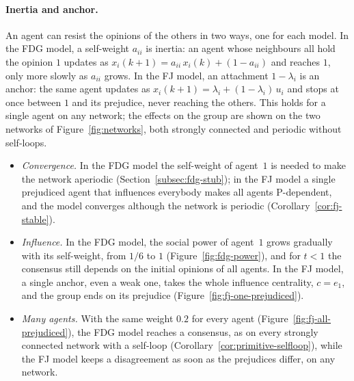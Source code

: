 \paragraph{Inertia and anchor.}
An agent can resist the opinions of the others in two ways, one for each model.
In the FDG model, a self-weight $a_{ii}$ is inertia:
an agent whose neighbours all hold the opinion $1$ updates as
$x_i(k+1) = a_{ii}\, x_i(k) + (1 - a_{ii})$ and reaches $1$, only more slowly as $a_{ii}$
grows. In the FJ model, an attachment $1 - \lambda_i$ is an anchor: the same agent updates as
$x_i(k+1) = \lambda_i + (1 - \lambda_i)\, u_i$ and stops at once between $1$ and its
prejudice, never reaching the others. This holds for a single agent on any network; the
effects on the group are shown on the two networks of Figure~\ref{fig:networks}, both
strongly connected and periodic without self-loops.
\begin{itemize}
  \item \emph{Convergence.} In the FDG model the self-weight of agent~$1$ is needed to
        make the network aperiodic (Section~\ref{subsec:fdg-stub}); in the FJ model a
        single prejudiced agent that influences everybody makes all agents P-dependent, and
        the model converges although the network is periodic
        (Corollary~\ref{cor:fj-stable}).
  \item \emph{Influence.} In the FDG model, the social power of agent~$1$ grows gradually with its
        self-weight, from $1/6$ to $1$ (Figure~\ref{fig:fdg-power}), and for $t < 1$
        the consensus still depends on the initial opinions of all agents. In the FJ
        model, a single anchor, even a weak one,
 takes the whole influence centrality,
 $c = e_1$, and the
        group ends on its prejudice (Figure~\ref{fig:fj-one-prejudiced}).
  \item \emph{Many agents.} With the same weight $0.2$ for every agent
        (Figure~\ref{fig:fj-all-prejudiced}), the FDG model reaches a consensus, as on
        every strongly connected network with a self-loop
        (Corollary~\ref{cor:primitive-selfloop}), while the FJ model keeps a disagreement
        as soon as the prejudices differ, on any network.
\end{itemize}

